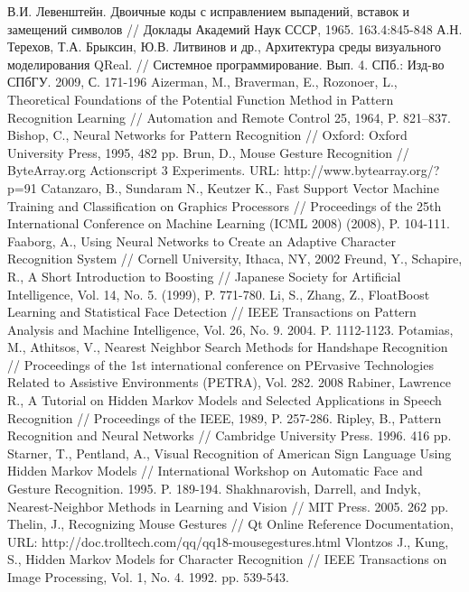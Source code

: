 \documentclass[a5paper]{article}
\begin{document}
\begin{thebibliography}{9001}
   В.И. Левенштейн. Двоичные коды с исправлением выпадений, вставок и замещений символов // Доклады Академий Наук СССР, 1965. 163.4:845-848
   А.Н. Терехов, Т.А. Брыксин, Ю.В. Литвинов и др., Архитектура среды визуального моделирования QReal. // Системное программирование. Вып. 4. СПб.: Изд-во СПбГУ. 2009, С. 171-196
   Aizerman, M., Braverman, E., Rozonoer, L., Theoretical Foundations of the Potential Function Method in Pattern Recognition Learning // Automation and Remote Control 25, 1964, P. 821–837.
   Bishop, C., Neural Networks for Pattern Recognition // Oxford: Oxford University Press, 1995, 482 pp.
   Brun, D., Mouse Gesture Recognition // ByteArray.org Actionscript 3 Experiments. URL: http://www.bytearray.org/?p=91 
   Catanzaro, B., Sundaram N., Keutzer K., Fast Support Vector Machine Training and Classification on Graphics Processors // Proceedings of the 25th International Conference on Machine Learning (ICML 2008) (2008), P. 104-111.
	 Faaborg, A., Using Neural Networks to Create an Adaptive Character Recognition System // Cornell University, Ithaca, NY, 2002
   Freund, Y., Schapire, R., A Short Introduction to Boosting // Japanese Society for Artificial Intelligence, Vol. 14, No. 5. (1999), P. 771-780.
   Li, S., Zhang, Z., FloatBoost Learning and Statistical Face Detection // IEEE Transactions on Pattern Analysis and Machine Intelligence, Vol. 26, No. 9. 2004. P. 1112-1123.
   Potamias, M., Athitsos, V., Nearest Neighbor Search Methods for Handshape Recognition // Proceedings of the 1st international conference on PErvasive Technologies Related to Assistive Environments (PETRA), Vol. 282. 2008
   Rabiner, Lawrence R., A Tutorial on Hidden Markov Models and Selected Applications in Speech Recognition // Proceedings of the IEEE, 1989, P. 257-286.
   Ripley, B., Pattern Recognition and Neural Networks // Cambridge University Press. 1996. 416 pp.
   Starner, T., Pentland, A., Visual Recognition of American Sign Language Using Hidden Markov Models // International Workshop on Automatic Face and Gesture Recognition. 1995. P. 189-194.
   Shakhnarovish, Darrell, and Indyk, Nearest-Neighbor Methods in Learning and Vision // MIT Press. 2005. 262 pp.
   Thelin, J., Recognizing Mouse Gestures // Qt Online Reference Documentation, URL: http://doc.trolltech.com/qq/qq18-mousegestures.html 
   Vlontzos J., Kung, S., Hidden Markov Models for Character Recognition // IEEE Transactions on Image Processing, Vol. 1, No. 4. 1992. pp. 539-543.
\end{thebibliography}  
\end{document}
